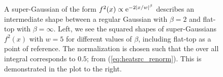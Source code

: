 \begin{figure}
\centering
{}
\caption{A super-Gaussian of the form
$f^2(x) \propto \mathrm{e}^{-2|x/w|^\beta}$
\cite{Chernikov2010}
describes an intermediate shape
between a regular Gaussian with $\beta=2$
and flat-top with $\beta=\infty$.
Left,
we see the squared shapes
of super-Gaussians $f^2(x)$ with $w=5$
for different values of $\beta$,
including flat-top as a point of reference.
The normalization is chosen such that
the over all integral corresponds to $0.5$;
from (\ref{eq:heatsrc_renorm}).
This is demonstrated in the plot to the right.}
\label{img:visuallize_sGauss}
\end{figure}